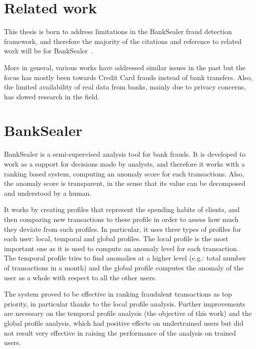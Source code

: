 
\section{Related work}

This thesis is born to address limitations in the BankSealer fraud detection framework, and therefore the majority of the citations and reference to related work will be for BankSealer~\cite{banksealer}.

More in general, various works have addressed similar issues in the past but the focus has mostly been towards Credit Card frauds instead of bank transfers. Also, the limited availability of real data from banks, mainly due to privacy concerns, has slowed research in the field.

\section{BankSealer}

BankSealer is a semi-supervised analysis tool for bank frauds. It is developed to work as a support for decisions made by analysts, and therefore it works with a ranking based system, computing an anomaly score for each transactions. Also, the anomaly score is transparent, in the sense that its value can be decomposed and understood by a human.

It works by creating profiles that represent the spending habits of clients, and then comparing new transactions to these profile in order to assess how much they deviate from such profiles. In particular, it uses three types of profiles for each user: local, temporal and global profiles. The local profile is the most important one as it is used to compute an anomaly level for each transaction. The temporal profile tries to find anomalies at a higher level (e.g.: total number of transactions in a month) and the global profile computes the anomaly of the user as a whole with respect to all the other users.

The system proved to be effective in ranking fraudulent transactions as top priority, in particular thanks to the local profile analysis. Further improvements are necessary on the temporal profile analysis (the objective of this work) and the global profile analysis, which had positive effects on undertrained users but did not result very effective in raising the performance of the analysis on trained users.
